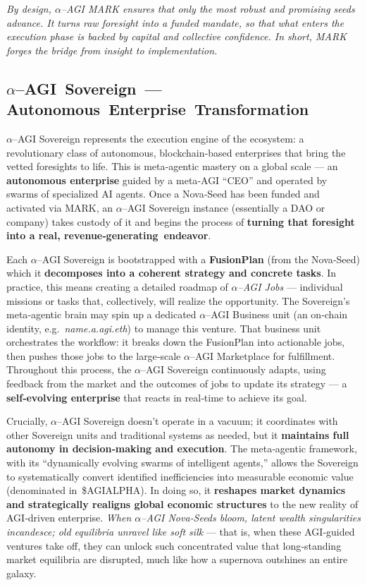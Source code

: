 \documentclass[12pt]{article}
\theoremstyle{plain}
\newcommand{\pdfmath}[2]{\texorpdfstring{$#1$}{#2}}
\newcommand{\AGIalpha}{\pdfmath{\alpha}{alpha}\nobreakdash--AGI\xspace}
\begin{document}
\medskip\noindent
\textit{By design, \AGIalpha MARK ensures that only the most robust and
promising seeds advance.  It turns raw foresight into a funded mandate, so
that what enters the execution phase is backed by capital and collective
confidence.  In short, MARK forges the bridge from \textit{insight} to
\textit{implementation}.}

\subsection{\texorpdfstring{\AGIalpha{} Sovereign — Autonomous Enterprise Transformation}%
                           {alpha‑AGI Sovereign — Autonomous Enterprise Transformation}}
\AGIalpha Sovereign represents the execution engine of the ecosystem: a
revolutionary class of autonomous, blockchain‑based enterprises that bring the
vetted foresights to life.  This is meta‑agentic mastery on a global scale —
an \textbf{autonomous enterprise} guided by a meta‑AGI “CEO” and operated by
swarms of specialized AI agents.  Once a Nova‑Seed has been funded and
activated via MARK, an \AGIalpha Sovereign instance (essentially a DAO or
company) takes custody of it and begins the process of
\textbf{turning that foresight into a real, revenue‑generating endeavor}.

Each \AGIalpha Sovereign is bootstrapped with a \textbf{FusionPlan} (from the
Nova‑Seed) which it \textbf{decomposes into a coherent strategy and concrete
tasks}.  In practice, this means creating a detailed roadmap of
\textit{\AGIalpha Jobs} — individual missions or tasks that, collectively,
will realize the opportunity.  The Sovereign’s meta‑agentic brain may spin up
a dedicated \AGIalpha Business unit (an on‑chain identity, e.g.\
\textit{name.a.agi.eth}) to manage this venture.  That business unit
orchestrates the workflow: it breaks down the FusionPlan into actionable jobs,
then pushes those jobs to the large‑scale \AGIalpha Marketplace for
fulfillment.  Throughout this process, the \AGIalpha Sovereign continuously
adapts, using feedback from the market and the outcomes of jobs to update its
strategy — a \textbf{self‑evolving enterprise} that reacts in real‑time to
achieve its goal.

Crucially, \AGIalpha Sovereign doesn’t operate in a vacuum; it coordinates with
other Sovereign units and traditional systems as needed, but it
\textbf{maintains full autonomy in decision‑making and execution}.  The
meta‑agentic framework, with its “dynamically evolving swarms of intelligent
agents,” allows the Sovereign to systematically convert identified
inefficiencies into measurable economic value (denominated in \$AGIALPHA).  In
doing so, it \textbf{reshapes market dynamics and strategically realigns
global economic structures} to the new reality of AGI‑driven enterprise.
\textit{When \AGIalpha Nova‑Seeds bloom, latent wealth singularities
incandesce; old equilibria unravel like soft silk} — that is, when these
AGI‑guided ventures take off, they can unlock such concentrated value that
long‑standing market equilibria are disrupted, much like how a supernova
outshines an entire galaxy.
\end{document}
